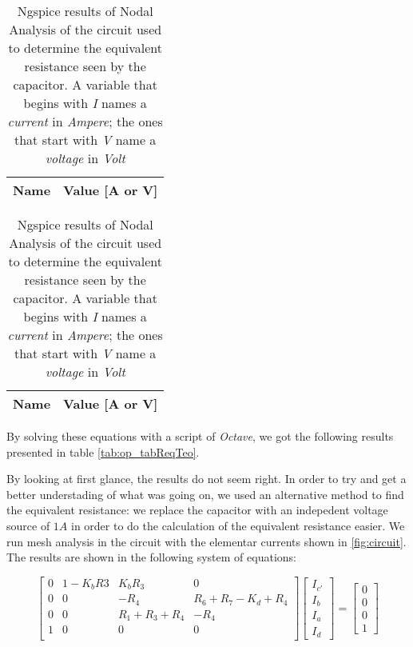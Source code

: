 \begin{table}
  \parbox{.45\linewidth}{
    \centering
    \begin{tabular}{|c|c|}
      \hline
      {\bf Name} & {\bf Value [A or V]} \\ \hline
      
    \end{tabular}
    \label{tab:op_tabReqTeo}
    \caption{Theoretical Results of Nodal Analysis of the circuit used to determine the equivalent resistance seen by the capacitor. A variable that begins  with \textit{I} names a \textit{current} in \textit{Ampere}; the ones that start with \textit{V} name a \textit{voltage} in \textit{Volt} }
  }
  \hfill
  \parbox{.45\linewidth}{
    \centering
    \begin{tabular}{|c|c|}
      {\bf Name} & {\bf Value [A or V]} \\ \hline
      
      \hline
    \end{tabular}
    \label{tab:op_tabReqSpice}
    \caption{Ngspice results of Nodal Analysis of the circuit used to determine the equivalent resistance seen by the capacitor. A variable that begins  with \textit{I} names a \textit{current} in \textit{Ampere}; the ones that start with \textit{V} name a \textit{voltage} in \textit{Volt} }
  }
\end{table}

By solving these equations with a script of \textit{Octave}, we got the following results presented in table \ref{tab:op_tabReqTeo}.


By looking at first glance, the results do not seem right. In order to try and get a better understading of what was going on, we used an alternative method to find the equivalent resistance: we replace the capacitor with an indepedent voltage source of $1 A$ in order to do the calculation of the equivalent resistance easier.
We run mesh analysis in the circuit with the elementar currents shown in \ref{fig:circuit}. The results are shown in the following system of equations:

\[
  \begin{bmatrix}
    0 & 1-K_b R3 & K_b R_3         & 0                     \\
    0 & 0        & -R_4            & R_6 + R_7 - K_d + R_4 \\
    0 & 0        & R_1 + R_3 + R_4 & -R_4                  \\
    1 & 0        & 0               & 0                     \\
  \end{bmatrix}
  \begin{bmatrix}
    I_{c'} \\ I_b \\ I_a \\ I_d
  \end{bmatrix}
  =
  \begin{bmatrix}
    0 \\ 0 \\ 0 \\ 1
  \end{bmatrix}
\]


